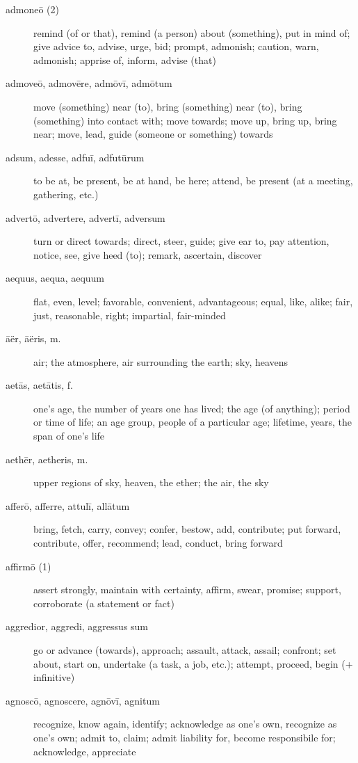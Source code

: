 \begin{description}
    \item[admoneō (2)] remind (of or that), remind (a person) about (something), put in mind of; give advice to, advise, urge, bid; prompt, admonish; caution, warn, admonish; apprise of, inform, advise (that)
    \item[admoveō, admovēre, admōvī, admōtum]  move (something) near (to), bring (something) near (to), bring (something) into contact with; move towards; move up, bring up, bring near; move, lead, guide (someone or something) towards
    \item[adsum, adesse, adfuī, adfutūrum] \marginnote{*}to be at, be present, be at hand, be here; attend, be present (at a meeting, gathering, etc.)
    \item[advertō, advertere, advertī, adversum] \marginnote{*}turn or direct towards; direct, steer, guide; give ear to, pay attention, notice, see, give heed (to); remark, ascertain, discover
    \item[aequus, aequa, aequum] \marginnote{*}flat, even, level; favorable, convenient, advantageous; equal, like, alike; fair, just, reasonable, right; impartial, fair-minded
    \item[āër, āëris, m.] \marginnote{*}air; the atmosphere, air surrounding the earth; sky, heavens
    \item[aetās, aetātis, f.] \marginnote{*}one's age, the number of years one has lived; the age (of anything); period or time of life; an age group, people of a particular age; lifetime, years, the span of one's life
    \item[aethēr, aetheris, m.] \marginnote{*}upper regions of sky, heaven, the ether; the air, the sky
    \item[afferō, afferre, attulī, allātum] \marginnote{*}bring, fetch, carry, convey; confer, bestow, add, contribute; put forward, contribute, offer, recommend; lead, conduct, bring forward
    \item[affirmō (1)] assert strongly, maintain with certainty, affirm, swear, promise; support, corroborate (a statement or fact)
    \item[aggredior, aggredi, aggressus sum] \marginnote{*}go or advance (towards), approach; assault, attack, assail; confront; set about, start on, undertake (a task, a job, etc.); attempt, proceed, begin (+ infinitive)
    \item[agnoscō, agnoscere, agnōvī, agnitum] \marginnote{*}recognize, know again, identify; acknowledge as one's own, recognize as one's own; admit to, claim; admit liability for, become responsibile for; acknowledge, appreciate

\end{description}
